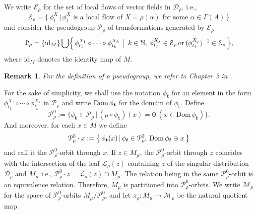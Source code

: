 \documentclass[a4paper,11pt,dvipdfmx]{article}
\newtheorem{rmk}{Remark}[section]
\numberwithin{equation}{section}
\begin{document}
We write $\mathcal{E}_{\rho}$ for the set of local flows of vector fields in $\mathcal{D}_{\rho}$, i.e., 
\[
\mathcal{E}_{\rho} = \bigl\{\,\phi_t^X\,|\,\text{$\phi_t^X$ is a local flow of $X=\rho(\alpha)$ for some $\alpha\in \varGamma(A)$}\,\bigr\} 
\]
and consider the pseudogroup $\mathcal{P}_{\rho}$ of transformations generated by $\mathcal{E}_{\rho}$  
\[
 \mathcal{P}_{\rho} = \{{\rm id}_M\} \bigcup \Bigl\{\,\phi_{t_1}^{X_1}\circ\cdots\circ\phi_{t_k}^{X_k}\, \bigm|\,k\in \mathbb{N},\, 
    \phi_{t_j}^{X_j}\in \mathcal{E}_{\rho}\, \text{or}\, (\phi_{t_j}^{X_j})^{-1}\in\mathcal{E}_{\rho}\,\Bigr\}, 
\]
where $\mathrm{id}_M$ denotes the identity map of $M$. 
\begin{rmk}
For the definition of a pseudogroup, we refer to Chapter 3 in \cite{ORmom04}. 
\end{rmk}
For the sake of simplicity, we shall use the notation $\phi_{\boldsymbol{t}}$ for an element in the form $\phi_{t_1}^{X_1}\circ\cdots\circ\phi_{t_k}^{X_k}$ in $\mathcal{P}_{\rho}$ 
and write ${\rm Dom}\,\phi_{\boldsymbol{t}}$ for the domain of $\phi_{\boldsymbol{t}}$. 
Define 
\[
 \mathcal{P}^0_{\rho} := \bigl\{\phi_{\boldsymbol{t}}\in \mathcal{P}_{\rho} \,|\, (\mu\circ\phi_{\boldsymbol{t}})(x) = \boldsymbol{0}~(x\in \mathrm{Dom}\,\phi_{\boldsymbol{t}})\bigr\}. 
\]
And moreover, for each $x\in M$ we define 
\[
\mathcal{P}^0_\rho\cdot x := \bigl\{\,\phi_{\boldsymbol{t}}(x)\,|\, \phi_{\boldsymbol{t}}\in\mathcal{P}^0_{\rho},\,{\rm Dom}\,\phi_{\boldsymbol{t}}\ni x\,\bigr\} 
\]
and call it the $\mathcal{P}^0_{\rho}$-orbit through $x$. If $z\in M_{\mu}$, the $\mathcal{P}^0_{\rho}$-orbit through $z$ coincides with the intersection of the leaf 
$\mathcal{L}_{\rho}(z)$ containing $z$ of the singular distribution $\mathcal{D}_{\rho}$ and $M_{\mu}$ i.e., $\mathcal{P}^0_\rho\cdot z = \mathcal{L}_{\rho}(z)\cap M_{\mu}$. 
The relation being in the same $\mathcal{P}^0_{\rho}$-orbit is an equivalence relation. Therefore, $M_{\mu}$ is partitioned into $\mathcal{P}^0_{\rho}$-orbits. We write $\mathcal{M}_{\rho}$ 
for the space of $\mathcal{P}^0_{\rho}$-orbits $M_{\mu}/\mathcal{P}^0_\rho$, and let $\pi_{\rho}:M_{\mu}\to \mathcal{M}_{\rho}$ be the natural quotient map. 
\end{document}
